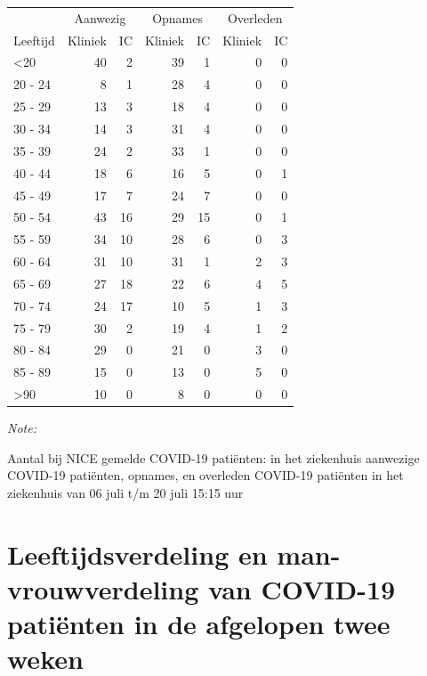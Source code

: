 \documentclass[
  english,
  man,floatsintext]{apa6}
\begin{document}
\begin{table}
\centering\begingroup\fontsize{10}{12}\selectfont

\begin{threeparttable}
\begin{tabular}{lrrrrrr}
\toprule
\multicolumn{1}{c}{ } & \multicolumn{2}{c}{Aanwezig} & \multicolumn{2}{c}{Opnames} & \multicolumn{2}{c}{Overleden} \\
\cmidrule(l{3pt}r{3pt}){2-3} \cmidrule(l{3pt}r{3pt}){4-5} \cmidrule(l{3pt}r{3pt}){6-7}
Leeftijd & Kliniek & IC & Kliniek & IC & Kliniek & IC\\
\midrule
<20 & 40 & 2 & 39 & 1 & 0 & 0\\
20 - 24 & 8 & 1 & 28 & 4 & 0 & 0\\
25 - 29 & 13 & 3 & 18 & 4 & 0 & 0\\
30 - 34 & 14 & 3 & 31 & 4 & 0 & 0\\
35 - 39 & 24 & 2 & 33 & 1 & 0 & 0\\
40 - 44 & 18 & 6 & 16 & 5 & 0 & 1\\
45 - 49 & 17 & 7 & 24 & 7 & 0 & 0\\
50 - 54 & 43 & 16 & 29 & 15 & 0 & 1\\
55 - 59 & 34 & 10 & 28 & 6 & 0 & 3\\
60 - 64 & 31 & 10 & 31 & 1 & 2 & 3\\
65 - 69 & 27 & 18 & 22 & 6 & 4 & 5\\
70 - 74 & 24 & 17 & 10 & 5 & 1 & 3\\
75 - 79 & 30 & 2 & 19 & 4 & 1 & 2\\
80 - 84 & 29 & 0 & 21 & 0 & 3 & 0\\
85 - 89 & 15 & 0 & 13 & 0 & 5 & 0\\
>90 & 10 & 0 & 8 & 0 & 0 & 0\\
\bottomrule
\end{tabular}
\begin{tablenotes}
\item \textit{Note: } 
\item Aantal bij NICE gemelde COVID-19 patiënten: in het ziekenhuis aanwezige COVID-19 patiënten, opnames, en overleden COVID-19 patiënten in het ziekenhuis van 06 juli t/m 20 juli 15:15 uur
\end{tablenotes}
\end{threeparttable}
\endgroup{}
\end{table}

\newpage

\hypertarget{leeftijdsverdeling-en-man-vrouwverdeling-van-covid-19-patiuxebnten-in-de-afgelopen-twee-weken}{%
\section{Leeftijdsverdeling en man-vrouwverdeling van COVID-19 patiënten in de afgelopen twee weken}\label{leeftijdsverdeling-en-man-vrouwverdeling-van-covid-19-patiuxebnten-in-de-afgelopen-twee-weken}}
\end{document}
